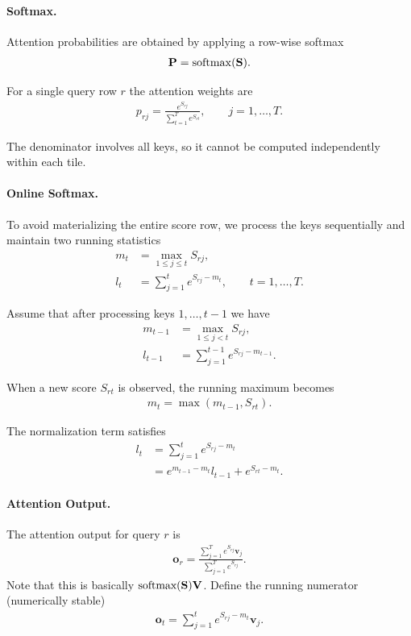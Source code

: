 \documentclass[11pt]{article}  %
\begin{document}
\paragraph{Softmax.}
Attention probabilities are obtained by applying a row-wise softmax
\begin{align*}
\mathbf{P} = \operatorname{softmax}(\mathbf{S}).
\end{align*}

For a single query row $r$ the attention weights are
\begin{align*}
p_{rj}
=
\frac{e^{S_{rj}}}{\sum_{t=1}^{T} e^{S_{rt}}},
\qquad j=1,\dots,T.
\end{align*}

The denominator involves all keys, so it cannot be computed independently
within each tile.

\paragraph{Online Softmax.}
To avoid materializing the entire score row, we process the keys
sequentially and maintain two running statistics
\begin{align*}
m_t &= \max_{1\le j\le t} S_{rj}, \\
l_t &= \sum_{j=1}^{t} e^{S_{rj}-m_t},
\qquad t=1,\dots,T .
\end{align*}

Assume that after processing keys $1,\dots,t-1$ we have
\begin{align*}
m_{t-1} &= \max_{1\le j<t} S_{rj}, \\
l_{t-1} &= \sum_{j=1}^{t-1} e^{S_{rj}-m_{t-1}} .
\end{align*}

When a new score $S_{rt}$ is observed, the running maximum becomes
\begin{align*}
m_t = \max(m_{t-1}, S_{rt}).
\end{align*}

The normalization term satisfies
\begin{align*}
l_t
&=
\sum_{j=1}^{t} e^{S_{rj}-m_t} \\
&=
e^{m_{t-1}-m_t} l_{t-1}
+
e^{S_{rt}-m_t}.
\end{align*}

\paragraph{Attention Output.}
The attention output for query $r$ is
\begin{align*}
\mathbf{o}_r
=
\frac{\sum_{j=1}^{T} e^{S_{rj}} \mathbf{v}_j}
{\sum_{j=1}^{T} e^{S_{rj}}}.
\end{align*}
Note that this is basically $\text{softmax}(\mathbf{S})\mathbf{V}$.
Define the running numerator (numerically stable)
\begin{align*}
\mathbf{o}_t
=
\sum_{j=1}^{t} e^{S_{rj}-m_t} \mathbf{v}_j .
\end{align*}
\end{document}
